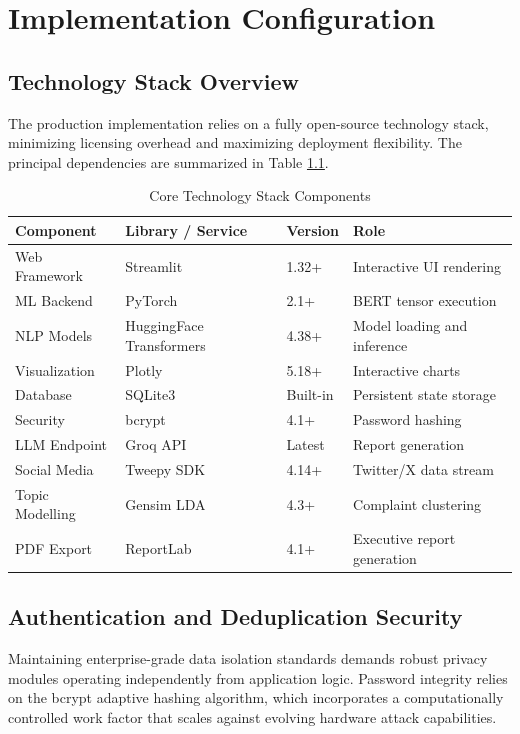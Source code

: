 \documentclass[12pt,a4paper]{report}
\begin{document}
\chapter{Implementation Configuration}

\section{Technology Stack Overview}
The production implementation relies on a fully open-source technology stack, minimizing licensing overhead and maximizing deployment flexibility. The principal dependencies are summarized in Table \ref{tab:techstack}.

\begin{table}[H]
\centering
\caption{Core Technology Stack Components}
\label{tab:techstack}
\begin{tabular}{@{}llll@{}}
\toprule
\textbf{Component} & \textbf{Library / Service} & \textbf{Version} & \textbf{Role} \\
\midrule
Web Framework     & Streamlit        & 1.32+     & Interactive UI rendering \\
ML Backend        & PyTorch          & 2.1+      & BERT tensor execution \\
NLP Models        & HuggingFace Transformers & 4.38+ & Model loading and inference \\
Visualization     & Plotly           & 5.18+     & Interactive charts \\
Database          & SQLite3          & Built-in  & Persistent state storage \\
Security          & bcrypt           & 4.1+      & Password hashing \\
LLM Endpoint      & Groq API         & Latest    & Report generation \\
Social Media      & Tweepy SDK       & 4.14+     & Twitter/X data stream \\
Topic Modelling   & Gensim LDA       & 4.3+      & Complaint clustering \\
PDF Export        & ReportLab        & 4.1+      & Executive report generation \\
\bottomrule
\end{tabular}
\end{table}

\section{Authentication and Deduplication Security}
Maintaining enterprise-grade data isolation standards demands robust privacy modules operating independently from application logic. Password integrity relies on the bcrypt adaptive hashing algorithm, which incorporates a computationally controlled work factor that scales against evolving hardware attack capabilities.
\end{document}
